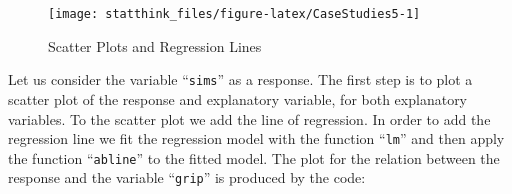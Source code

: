 \documentclass[]{krantz}
\makeatletter
\newenvironment{Shaded}{\begin{snugshade}}{\end{snugshade}}
\newcommand{\KeywordTok}[1]{\textcolor[rgb]{0.13,0.29,0.53}{\textbf{#1}}}
\newcommand{\DataTypeTok}[1]{\textcolor[rgb]{0.13,0.29,0.53}{#1}}
\newcommand{\DecValTok}[1]{\textcolor[rgb]{0.00,0.00,0.81}{#1}}
\newcommand{\FloatTok}[1]{\textcolor[rgb]{0.00,0.00,0.81}{#1}}
\newcommand{\StringTok}[1]{\textcolor[rgb]{0.31,0.60,0.02}{#1}}
\newcommand{\CommentTok}[1]{\textcolor[rgb]{0.56,0.35,0.01}{\textit{#1}}}
\newcommand{\OperatorTok}[1]{\textcolor[rgb]{0.81,0.36,0.00}{\textbf{#1}}}
\newcommand{\NormalTok}[1]{#1}
\newenvironment{kframe}{%
\medskip{}
\setlength{\fboxsep}{.8em}
 \def\at@end@of@kframe{}%
 \ifinner\ifhmode%
  \def\at@end@of@kframe{\end{minipage}}%
  \begin{minipage}{\columnwidth}%
 \fi\fi%
 \def\FrameCommand##1{\hskip\@totalleftmargin \hskip-\fboxsep
 \colorbox{shadecolor}{##1}\hskip-\fboxsep
     \hskip-\linewidth \hskip-\@totalleftmargin \hskip\columnwidth}%
 \MakeFramed {\advance\hsize-\width
   \@totalleftmargin\z@ \linewidth\hsize
   \@setminipage}}%
 {\par\unskip\endMakeFramed%
 \at@end@of@kframe}
\renewenvironment{Shaded}{\begin{kframe}}{\end{kframe}}
\theoremstyle{definition}
\theoremstyle{definition}
\theoremstyle{definition}
\theoremstyle{remark}
\makeatother
\begin{document}
\begin{Shaded}
\end{Shaded}

\begin{figure}

{\centering \texttt{[image: statthink\_files/figure-latex/CaseStudies5-1]} 

}

\caption{Scatter Plots and Regression Lines}\label{fig:CaseStudies5}
\end{figure}

Let us consider the variable ``\texttt{sims}'' as a response. The first
step is to plot a scatter plot of the response and explanatory variable,
for both explanatory variables. To the scatter plot we add the line of
regression. In order to add the regression line we fit the regression
model with the function ``\texttt{lm}'' and then apply the function
``\texttt{abline}'' to the fitted model. The plot for the relation
between the response and the variable ``\texttt{grip}'' is produced by
the code:
\end{document}
